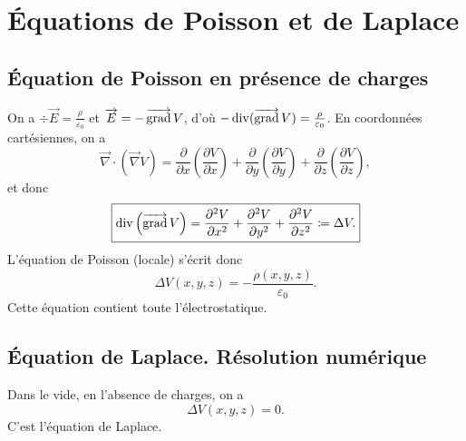 \section{Équations de Poisson et de Laplace}

    \subsection{Équation de Poisson en présence de charges}

        On a $\div\vec{E}=\frac{\rho}{\varepsilon_0}$ et $\protect\overrightarrow{{E}}=-\operatorname{\overrightarrow{\text{grad}}} V$, d'où $-\operatorname{div}(\operatorname{\overrightarrow{\text{grad}}} V)=\frac{\rho}{\varepsilon_0}$. En coordonnées cartésiennes, on a 
        \begin{equation*}
            \vec{\nabla}\cdot(\vec{\nabla}V)=\frac{\partial}{\partial x}\left(\frac{\partial V}{\partial x}\right)+\frac{\partial}{\partial y}\left(\frac{\partial V}{\partial y}\right)+\frac{\partial}{\partial z}\left(\frac{\partial V}{\partial z}\right),
        \end{equation*}
        et donc 
        \begin{equation*}
            \boxed{
                \operatorname{div}\left(\operatorname{\overrightarrow{\text{grad}}} V\right)=\frac{\partial^{2}V}{\partial x^{2}}+\frac{\partial^{2}V}{\partial y^{2}}+\frac{\partial^{2}V}{\partial z^{2}}\coloneqq\Delta V.
            }
        \end{equation*}
        L'équation de Poisson (locale) s'écrit donc
        \begin{equation*}
            \boxed{
                \Delta V(x,y,z)=-\frac{\rho(x,y,z)}{\varepsilon_0}.
            }
        \end{equation*}
        Cette équation contient \og toute l'électrostatique\fg.

    \subsection{Équation de Laplace. Résolution numérique}

        Dans le vide, en l'absence de charges, on a 
        \begin{equation*}
            \boxed{
                \Delta V(x,y,z)=0.
            }
        \end{equation*}
        C'est l'équation de Laplace. 

